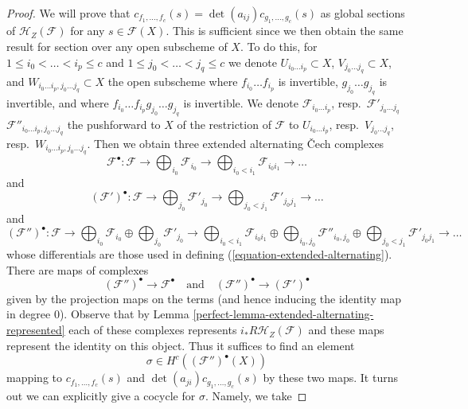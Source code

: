 \begin{proof}

We will prove that $c_{f_1, \ldots, f_c}(s) =
\det(a_{ij}) c_{g_1, \ldots, g_c}(s)$ as global sections of
$\mathcal{H}_Z(\mathcal{F})$ for any $s \in \mathcal{F}(X)$.
This is sufficient since we then obtain the same result for
section over any open subscheme of $X$.
To do this, for $1 \leq i_0 < \ldots < i_p \leq c$
and $1 \leq j_0 < \ldots < j_q \leq c$ we denote
$U_{i_0 \ldots i_p} \subset X$,
$V_{j_0 \ldots j_q} \subset X$, and
$W_{i_0 \ldots i_p, j_0 \ldots j_q} \subset X$
the open subscheme where $f_{i_0} \ldots f_{i_p}$ is invertible,
$g_{j_0} \ldots g_{j_q}$ is invertible, and where
$f_{i_0} \ldots f_{i_p}g_{j_0} \ldots g_{j_q}$ is invertible.
We denote $\mathcal{F}_{i_0 \ldots i_p}$,
resp.\ $\mathcal{F}'_{j_0 \ldots j_q}$
$\mathcal{F}''_{i_0 \ldots i_p, j_0 \ldots j_q}$
the pushforward to $X$ of the restriction of $\mathcal{F}$ to
$U_{i_0 \ldots i_p}$, resp.\ $V_{j_0 \ldots j_q}$,
resp.\ $W_{i_0 \ldots i_p, j_0 \ldots j_q}$.
Then we obtain three extended alternating {\v C}ech complexes
$$
\mathcal{F}^\bullet :
\mathcal{F} \to \bigoplus\nolimits_{i_0} \mathcal{F}_{i_0} \to
\bigoplus\nolimits_{i_0 < i_1} \mathcal{F}_{i_0i_1} \to \ldots
$$
and
$$
(\mathcal{F}')^\bullet :
\mathcal{F} \to \bigoplus\nolimits_{j_0} \mathcal{F}'_{j_0} \to
\bigoplus\nolimits_{j_0 < j_1} \mathcal{F}'_{j_0j_1} \to \ldots
$$
and
$$
(\mathcal{F}'')^\bullet :
\mathcal{F} \to
\bigoplus\nolimits_{i_0} \mathcal{F}_{i_0} \oplus
\bigoplus\nolimits_{j_0} \mathcal{F}'_{j_0} \to
\bigoplus\nolimits_{i_0 < i_1} \mathcal{F}_{i_0i_1} \oplus
\bigoplus\nolimits_{i_0, j_0} \mathcal{F}''_{i_0, j_0} \oplus
\bigoplus\nolimits_{j_0 < j_1} \mathcal{F}'_{j_0j_1} \to
\ldots
$$
whose differentials are those used in defining
(\ref{equation-extended-alternating}).
There are maps of complexes
$$
(\mathcal{F}'')^\bullet \to \mathcal{F}^\bullet
\quad\text{and}\quad
(\mathcal{F}'')^\bullet \to (\mathcal{F}')^\bullet
$$
given by the projection maps on the terms (and hence inducing
the identity map in degree $0$). Observe that by
Lemma \ref{perfect-lemma-extended-alternating-represented}
each of these complexes represents
$i_*R\mathcal{H}_Z(\mathcal{F})$ and these maps
represent the identity on this object. Thus it suffices
to find an element
$$
\sigma \in H^c((\mathcal{F}'')^\bullet(X))
$$
mapping to $c_{f_1, \ldots, f_c}(s)$ and $\det(a_{ji})c_{g_1, \ldots, g_c}(s)$
by these two maps. It turns out we can explicitly give a cocycle
for $\sigma$. Namely, we take

\end{proof}
